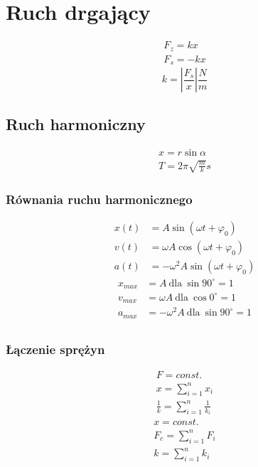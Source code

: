   \chapter{Ruch drgający}
    \begin{gather}
      F_z = kx\\
      F_s = -kx
    \end{gather}
    \begin{equation}
      k = \left|\frac{F_s}{x}\right| \unit{\frac Nm}
    \end{equation}
    \section{Ruch harmoniczny}
      \begin{gather}
        x = r\sin\alpha\\
        T = 2\pi\sqrt{\frac mk} \unit{s}
      \end{gather}
      \subsection{Równania ruchu harmonicznego}
        \begin{align}
          x(t) &= A\sin(\omega t + \varphi_0)\\
          v(t) &= \omega A\cos(\omega t + \varphi_0)\\
          a(t) &= -\omega^2A\sin(\omega t + \varphi_0)
        \end{align}
        \begin{align}
          x_{max} &= A\ \text{dla}\ \sin90^\circ = 1\\
          v_{max} &= \omega A\ \text{dla}\ \cos0^\circ = 1\\
          a_{max} &= -\omega^2A\ \text{dla}\ \sin90^\circ = 1\\
        \end{align}
      \subsection{Łączenie sprężyn}
        \begin{gather}
          F = const.\\
          x = \sum_{i=1}^n x_i\\
          \frac{1}{k} = \sum_{i=1}^n \frac{1}{k_i}
        \end{gather}
        \begin{gather}
          x = const.\\
          F_c = \sum_{i=1}^n F_i\\
          k = \sum_{i=1}^n k_i
        \end{gather}
